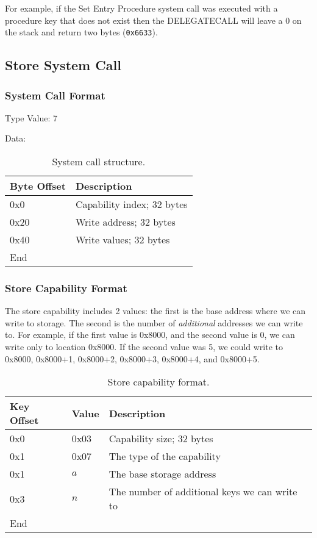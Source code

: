 \documentclass[english,a4paper]{article}
\let\oldparagraph\subsubsection
\renewcommand{\subsubsection}[1]{\oldparagraph{#1}\mbox{}}
\begin{document}
For example, if the Set Entry Procedure system call was executed with a
procedure key that does not exist then the DELEGATECALL will leave a 0 on the
stack and return two bytes (\texttt{0x6633}).

\subsection{Store System Call}

\subsubsection{System Call Format}
Type Value: 7

Data:

\begin{table}[H]
  \caption{System call structure.}
  \centering{}%
  \begin{tabular}{l|p{}}
    \hline
    Byte Offset & Description\tabularnewline
    \hline
    \hline
    0x0 & Capability index; 32 bytes \tabularnewline
    0x20 & Write address; 32 bytes \tabularnewline
    0x40 & Write values; 32 bytes \tabularnewline
    \hline
    End &  \tabularnewline
    \hline
  \end{tabular}
\end{table}

\subsubsection{Store Capability Format}
The store capability includes 2 values: the first is the base address where we
can write to storage. The second is the number of \emph{additional} addresses we
can write to. For example, if the first value is 0x8000, and the second value is
0, we can write only to location 0x8000. If the second value was 5, we could
write to 0x8000, 0x8000+1, 0x8000+2, 0x8000+3, 0x8000+4, and 0x8000+5.

\begin{table}[H]
  \caption{Store capability format.}
  \centering{}%
  \begin{tabular}{l|l|p{}}
    \hline
    Key Offset & Value & Description\tabularnewline
    \hline
    \hline
    0x0 & 0x03 & Capability size; 32 bytes \tabularnewline
    0x1 & 0x07 & The type of the capability \tabularnewline
    0x1 & $a$ & The base storage address\tabularnewline
    0x3 & $n$ & The number of additional keys we can write to\tabularnewline
    \hline
    End &  \tabularnewline
    \hline
  \end{tabular}
\end{table}
\end{document}
